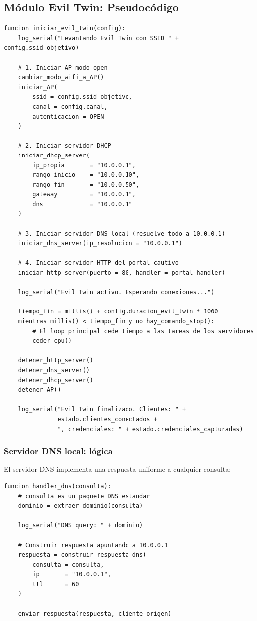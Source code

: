 \documentclass[11pt,a4paper]{article}
\begin{document}
\subsection{Módulo Evil Twin: Pseudocódigo}

\begin{lstlisting}
funcion iniciar_evil_twin(config):
    log_serial("Levantando Evil Twin con SSID " + config.ssid_objetivo)

    # 1. Iniciar AP modo open
    cambiar_modo_wifi_a_AP()
    iniciar_AP(
        ssid = config.ssid_objetivo,
        canal = config.canal,
        autenticacion = OPEN
    )

    # 2. Iniciar servidor DHCP
    iniciar_dhcp_server(
        ip_propia       = "10.0.0.1",
        rango_inicio    = "10.0.0.10",
        rango_fin       = "10.0.0.50",
        gateway         = "10.0.0.1",
        dns             = "10.0.0.1"
    )

    # 3. Iniciar servidor DNS local (resuelve todo a 10.0.0.1)
    iniciar_dns_server(ip_resolucion = "10.0.0.1")

    # 4. Iniciar servidor HTTP del portal cautivo
    iniciar_http_server(puerto = 80, handler = portal_handler)

    log_serial("Evil Twin activo. Esperando conexiones...")

    tiempo_fin = millis() + config.duracion_evil_twin * 1000
    mientras millis() < tiempo_fin y no hay_comando_stop():
        # El loop principal cede tiempo a las tareas de los servidores
        ceder_cpu()

    detener_http_server()
    detener_dns_server()
    detener_dhcp_server()
    detener_AP()

    log_serial("Evil Twin finalizado. Clientes: " +
               estado.clientes_conectados +
               ", credenciales: " + estado.credenciales_capturadas)
\end{lstlisting}

\subsubsection{Servidor DNS local: lógica}
El servidor DNS implementa una respuesta uniforme a cualquier consulta:

\begin{lstlisting}
funcion handler_dns(consulta):
    # consulta es un paquete DNS estandar
    dominio = extraer_dominio(consulta)

    log_serial("DNS query: " + dominio)

    # Construir respuesta apuntando a 10.0.0.1
    respuesta = construir_respuesta_dns(
        consulta = consulta,
        ip       = "10.0.0.1",
        ttl      = 60
    )

    enviar_respuesta(respuesta, cliente_origen)
\end{lstlisting}
\end{document}
